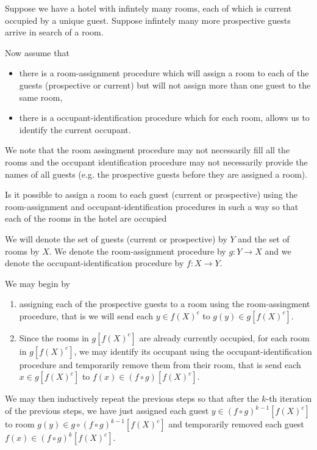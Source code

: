 \documentclass{book}
\begin{document}
	
	
	\begin{questn}
		Suppose we have a hotel with infintely many rooms, each of which is current occupied by a unique guest. Suppose infintely many more prospective guests arrive in search of a room. 
		
		Now assume that 
		\begin{itemize}
			\item there is a room-assignment procedure which will assign a room to each of the guests (prospective or current) but will not assign more than one guest to the same room,
			\item there is a occupant-identification procedure which for each room, allows us to identify the current occupant.
		\end{itemize}
		
		We note that the room assingment procedure may not necessarily fill all the rooms and the occupant identification procedure may not necessarily provide the names of all guests (e.g. the prospective guests before they are assigned a room).
		
		Is it possible to assign a room to each guest (current or prospective) using the room-assignment and occupant-identification procedures in such a way so that each of the rooms in the hotel are occupied 
	\end{questn}
	
	
	\begin{soln}
		We will denote the set of guests (current or prospective) by $Y$ and the set of rooms by $X$. We denote the room-assignment procedure by $g:Y \rightarrow X$ and we denote the occupant-identification procedure by $f:X \rightarrow Y$. 
		
		We may begin by 
		\begin{enumerate}
			\item assigning each of the prospective guests to a room using the room-assingment procedure, that is we will send each $y \in f(X)^c$ to $g(y) \in g[f(X)^c]$.
			\item Since the rooms in $g[f(X)^c]$ are already currently occupied, for each room in $g[f(X)^c]$, we may identify its occupant using the occupant-identification procedure and temporarily remove them from their room, that is send each $x \in g[f(X)^c]$ to $f(x) \in (f \circ g)[f(X)^c]$.
		\end{enumerate}
		We may then inductively repeat the previous steps so that after the $k$-th iteration of the previous steps, we have just assigned each guest $y \in (f \circ g)^{k-1}[f(X)^c]$ to room $g(y) \in g \circ (f \circ g)^{k-1}[f(X)^c]$ and temporarily removed each guest $f(x) \in (f \circ g)^k[f(X)^c]$. 
	\end{soln}
	
\end{document}
